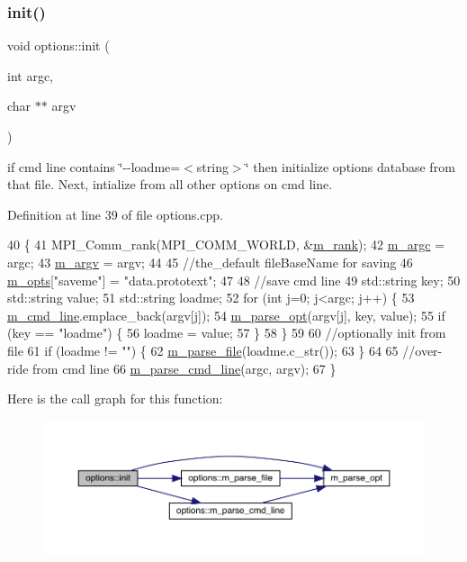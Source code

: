 \subsubsection{\texorpdfstring{init()}{init()}}
{\footnotesize\ttfamily void options\+::init (\begin{DoxyParamCaption}\item[{int}]{argc,  }\item[{char $\ast$$\ast$}]{argv }\end{DoxyParamCaption})}

if cmd line contains \char`\"{}-\/-\/loadme=$<$string$>$\char`\"{} then initialize options database from that file. Next, intialize from all other options on cmd line. 

Definition at line 39 of file options.\+cpp.


\begin{DoxyCode}
40 \{
41   MPI\_Comm\_rank(MPI\_COMM\_WORLD, &\hyperlink{classoptions_a3171bb61cdfcc5a6a899ad6fe9b56f9d}{m\_rank});
42   \hyperlink{classoptions_a5df2188c2d1bb81cbebef4b2e80a926f}{m\_argc} = argc;
43   \hyperlink{classoptions_a376f7dcfec6a2ff75835c3c3d732bdea}{m\_argv} = argv;
44 
45   \textcolor{comment}{//the\_default fileBaseName for saving}
46   \hyperlink{classoptions_ac73507ca925d98ee5ff6f04937dff5c3}{m\_opts}[\textcolor{stringliteral}{"saveme"}] = \textcolor{stringliteral}{"data.prototext"};
47 
48   \textcolor{comment}{//save cmd line}
49   std::string key;
50   std::string value;
51   std::string loadme;
52   \textcolor{keywordflow}{for} (\textcolor{keywordtype}{int} j=0; j<argc; j++) \{
53     \hyperlink{classoptions_a64ad628e508d5d71a117909e44f68350}{m\_cmd\_line}.emplace\_back(argv[j]);
54     \hyperlink{options_8cpp_a18f37a1b6f36c00656e52d130c2132d2}{m\_parse\_opt}(argv[j], key, value);
55     \textcolor{keywordflow}{if} (key == \textcolor{stringliteral}{"loadme"}) \{
56       loadme = value;
57     \}
58   \}
59 
60   \textcolor{comment}{//optionally init from file}
61   \textcolor{keywordflow}{if} (loadme != \textcolor{stringliteral}{""}) \{
62     \hyperlink{classoptions_abeab2c3e2cf5c1809e09601a3835d967}{m\_parse\_file}(loadme.c\_str());
63   \}
64 
65   \textcolor{comment}{//over-ride from cmd line}
66   \hyperlink{classoptions_a441540f2a8990edaa17fe95b013f9168}{m\_parse\_cmd\_line}(argc, argv);
67 \}
\end{DoxyCode}
Here is the call graph for this function\+:\nopagebreak
\begin{figure}[H]
\begin{center}
\leavevmode
\includegraphics[width=350pt]{classoptions_a6d909eacd89dee5f0b153430985f9822_cgraph}
\end{center}
\end{figure}
